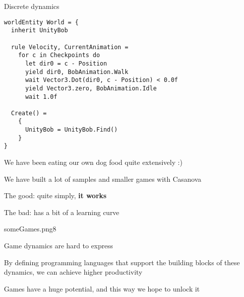 \documentclass{beamer}
\begin{document}
\begin{frame}[fragile]{Discrete dynamics}
\begin{lstlisting}
worldEntity World = {
  inherit UnityBob

  rule Velocity, CurrentAnimation = 
    for c in Checkpoints do
      let dir0 = c - Position
      yield dir0, BobAnimation.Walk
      wait Vector3.Dot(dir0, c - Position) < 0.0f
      yield Vector3.zero, BobAnimation.Idle
      wait 1.0f

  Create() =
    {
      UnityBob = UnityBob.Find()
    }
}
\end{lstlisting}
\end{frame}

\begin{slide}{
\item We have been eating our own dog food quite extensively :)
\item We have built a lot of samples and smaller games with Casanova
\pause
\item The good: quite simply, \textbf{it works}
\item The bad: has a bit of a learning curve
}\end{slide}

\begin{pictureSlide}{someGames.png}{8}
\end{pictureSlide}


\begin{slide}{
\item Game dynamics are hard to express
\item By defining programming languages that support the building blocks of these dynamics, we can achieve higher productivity
\item Games have a huge potential, and this way we hope to unlock it
}\end{slide}

\begin{thankyou}
\end{thankyou}
\end{document}
